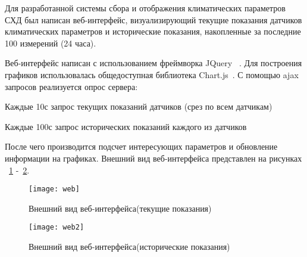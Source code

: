 Для разработанной системы сбора и отображения климатических параметров СХД был написан веб-интерфейс, визуализирующий текущие показания датчиков климатических параметров и исторические показания, накопленные за последние 100 измерений (24 часа). 

Веб-интерфейс написан с использованием фреймворка JQuery ~\cite{jQuery}. Для построения графиков использовалась общедоступная библиотека Chart.js~\cite{Chartjs}. С помощью ajax запросов реализуется опрос сервера: 
\begin{itemize*}
	\item{Каждые 10с запрос текущих показаний датчиков (срез по всем датчикам)}
	\item{Каждые 100с запрос исторических показаний каждого из датчиков}
\end{itemize*}

После чего производится подсчет интересующих параметров и обновление информации на графиках.
Внешний вид веб-интерфейса представлен на рисунках ~\ref{fig:web} -~\ref{fig:web2}.
\begin{figure}[h]
	\centering
	\texttt{[image: web]}
	\caption{Внешний вид веб-интерфейса(текущие показания)}
	\label{fig:web}
\end{figure}

\begin{figure}[h]
	\centering
	\texttt{[image: web2]}
	\caption{Внешний вид веб-интерфейса(исторические показания)}
	\label{fig:web2}
\end{figure}





%
%





